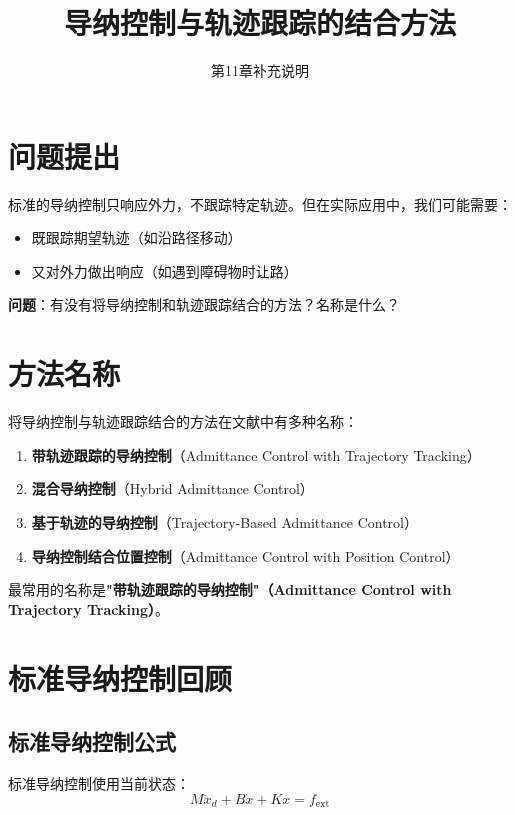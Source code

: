 \documentclass[12pt,a4paper]{article}
\title{导纳控制与轨迹跟踪的结合方法}
\author{第11章补充说明}
\date{}
\begin{document}
\maketitle

\section{问题提出}

标准的导纳控制只响应外力，不跟踪特定轨迹。但在实际应用中，我们可能需要：
\begin{itemize}
\item 既跟踪期望轨迹（如沿路径移动）
\item 又对外力做出响应（如遇到障碍物时让路）
\end{itemize}

\textbf{问题}：有没有将导纳控制和轨迹跟踪结合的方法？名称是什么？

\section{方法名称}

将导纳控制与轨迹跟踪结合的方法在文献中有多种名称：

\begin{enumerate}
\item \textbf{带轨迹跟踪的导纳控制}（Admittance Control with Trajectory Tracking）
\item \textbf{混合导纳控制}（Hybrid Admittance Control）
\item \textbf{基于轨迹的导纳控制}（Trajectory-Based Admittance Control）
\item \textbf{导纳控制结合位置控制}（Admittance Control with Position Control）
\end{enumerate}

最常用的名称是\textbf{"带轨迹跟踪的导纳控制"（Admittance Control with Trajectory Tracking）}。

\section{标准导纳控制回顾}

\subsection{标准导纳控制公式}

标准导纳控制使用当前状态：
\begin{equation}
M\ddot{x}_d + B\dot{x} + Kx = f_{\text{ext}} \tag{11.64}
\end{equation}
\end{document}
